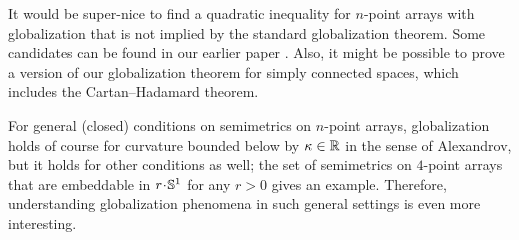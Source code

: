 \documentclass[a4paper,10pt]{article}
\begin{document}
It would be super-nice to find a quadratic inequality for $n$-point arrays with globalization that is not implied by the standard globalization theorem.
Some candidates can be found in our earlier paper \cite{lebedeva-petrunin-zolotov}.
Also, it might be possible to prove a version of our globalization theorem
for simply connected spaces, which includes the Cartan--Hadamard theorem.

For general (closed) conditions on semimetrics on $n$-point arrays, globalization holds of course for curvature bounded below by $\kappa\in \mathbb{R}$ in the sense of Alexandrov,
but it holds for other conditions as well;
the set of semimetrics on $4$-point arrays that are embeddable in $r\cdot\SSS^1$ for any $r>0$ gives an example.
Therefore, understanding globalization phenomena in such general settings is even more interesting.

{\sloppy
\def\emph{\textit}
\printbibliography[heading=bibintoc]
\fussy
}
\end{document}
